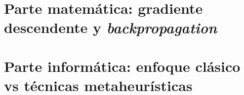 ﻿\documentclass[a4paper,11pt]{article}
\begin{document}

%
\tableofcontents
\newpage
%
\setcounter{page}{1}
\setcounter{section}{0}
%


\newpage

\part{Parte matemática: gradiente descendente y \textit{backpropagation}}
\vspace{4cm}

\newpage 










\newpage

\part{Parte informática: enfoque clásico vs técnicas metaheurísticas}

\vspace{4cm}

\newpage










\end{document}
